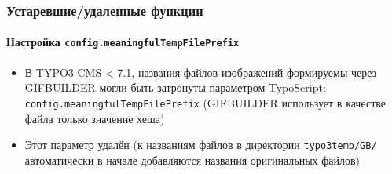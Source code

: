 
\begin{frame}[fragile]
	\frametitle{Устаревшие/удаленные функции}
	\framesubtitle{Настройка \texttt{config.meaningfulTempFilePrefix}}

	\begin{itemize}

		\item В TYPO3 CMS < 7.1, названия файлов изображений формируемы через GIFBUILDER могли быть
			затронуты параметром TypoScript:\newline
			\texttt{config.meaningfulTempFilePrefix}\newline
			\small
				(GIFBUILDER использует в качестве файла только значение хеша)
			\normalsize

		\item Этот параметр удалён (к названиям файлов в директории \texttt{typo3temp/GB/}
			автоматически в начале добавляются названия оригинальных файлов)

	\end{itemize}

\end{frame}




